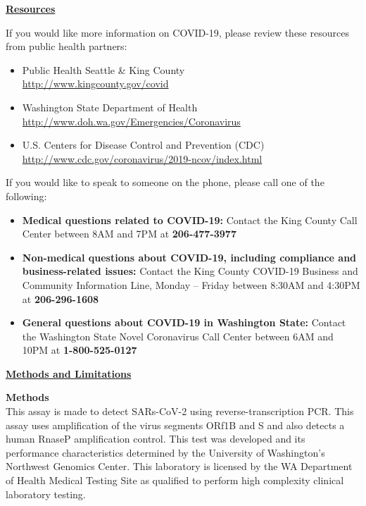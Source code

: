 \documentclass[10pt]{article}
\begin{document}
\bigskip

\large \underline{\textbf{Resources}}

If you would like more information on COVID-19, please review these resources
from public health partners:

\begin{itemize}
\item
  Public Health \textemdash Seattle \& King County\\
  \url{http://www.kingcounty.gov/covid}

\item

  Washington State Department of Health\\
  \url{http://www.doh.wa.gov/Emergencies/Coronavirus}

\item
  U.S. Centers for Disease Control and Prevention (CDC)\\
  \url{http://www.cdc.gov/coronavirus/2019-ncov/index.html}

\end{itemize}

If you would like to speak to someone on the phone, please call one of the
following:

\begin{itemize}

\item

  \textbf{Medical questions related to COVID-19:} Contact the King County Call
  Center between 8AM and 7PM at \textbf{206-477-3977}

\item

  \textbf{Non-medical questions about COVID-19, including compliance and
  business-related issues:} Contact the King County COVID-19 Business and
  Community Information Line, Monday – Friday between 8:30AM and 4:30PM at
  \textbf{206-296-1608}

\item

  \textbf{General questions about COVID-19 in Washington State:} Contact the
  Washington State Novel Coronavirus Call Center between 6AM and 10PM at
  \textbf{1-800-525-0127}

\end{itemize}

\bigskip

\large \underline{\textbf{Methods and Limitations}}

\textbf{Methods}\\
This assay is made to detect SARs-CoV-2 using reverse-transcription PCR. This
assay uses amplification of the virus segments ORf1B and S and also detects a
human RnaseP amplification control. This test was developed and its performance
characteristics determined by the University of Washington’s Northwest Genomics
Center. This laboratory is licensed by the WA Department of Health Medical
Testing Site as qualified to perform high complexity clinical laboratory
testing.
\end{document}
